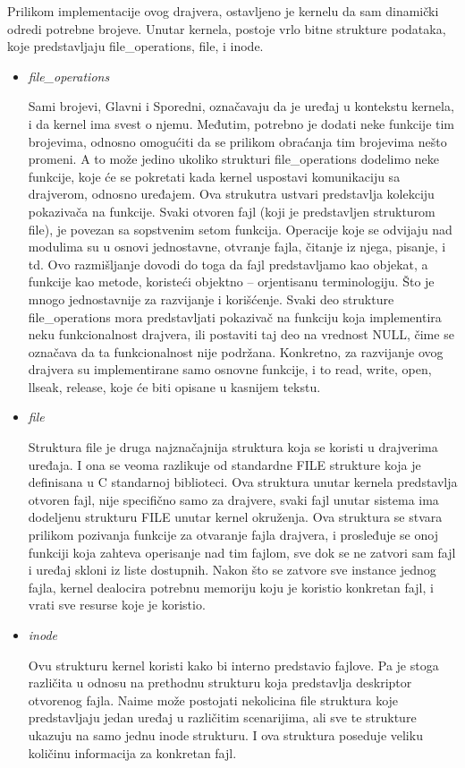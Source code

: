 \documentclass[a4paper, 12pt, diplomski]{etf}
\begin{document}
	Prilikom implementacije ovog drajvera, ostavljeno je kernelu da sam dinamički odredi potrebne brojeve. Unutar kernela, postoje vrlo bitne strukture podataka, koje predstavljaju file\_operations, file, i inode.

	\begin{itemize}

		\item \textit{file\_operations}

	Sami brojevi, Glavni i Sporedni, označavaju da je uređaj u kontekstu kernela, i da kernel ima svest o njemu. Međutim, potrebno je dodati neke funkcije tim brojevima, odnosno omogućiti da se prilikom obraćanja tim brojevima nešto promeni. A to može jedino ukoliko strukturi file\_operations dodelimo neke funkcije, koje će se pokretati kada kernel uspostavi komunikaciju sa drajverom, odnosno uređajem. Ova strukutra ustvari predstavlja kolekciju pokazivača na funkcije. Svaki otvoren fajl (koji je predstavljen strukturom file), je povezan sa sopstvenim setom funkcija. Operacije koje se odvijaju nad modulima su u osnovi jednostavne, otvranje fajla, čitanje iz njega, pisanje, i td. Ovo razmišljanje dovodi do toga da fajl predstavljamo kao objekat, a funkcije kao metode, koristeći objektno – orjentisanu terminologiju. Što je mnogo jednostavnije za razvijanje i korišćenje. Svaki deo strukture file\_operations mora predstavljati pokazivač na funkciju koja implementira neku funkcionalnost drajvera, ili postaviti taj deo na vrednost NULL, čime se označava da ta funkcionalnost nije podržana. Konkretno, za razvijanje ovog drajvera su implementirane samo osnovne funkcije, i to read, write, open, llseak, release, koje će biti opisane u kasnijem tekstu.

		\bigskip

		\item \textit{file}

	Struktura file je druga najznačajnija struktura koja se koristi u drajverima uređaja. I ona se veoma razlikuje od standardne FILE strukture koja je definisana u C standarnoj biblioteci. Ova struktura unutar kernela predstavlja otvoren fajl, nije specifično samo za drajvere, svaki fajl unutar sistema ima dodeljenu strukturu FILE unutar kernel okruženja. Ova struktura se stvara prilikom pozivanja funkcije za otvaranje fajla drajvera, i prosleđuje se onoj funkciji koja zahteva operisanje nad tim fajlom, sve dok se ne zatvori sam fajl i uređaj skloni iz liste dostupnih. Nakon što se zatvore sve instance jednog fajla, kernel dealocira potrebnu memoriju koju je koristio konkretan fajl, i vrati sve resurse koje je koristio.

		\bigskip

		\item \textit{inode}

		Ovu strukturu kernel koristi kako bi interno predstavio fajlove. Pa je stoga različita u odnosu na prethodnu strukturu koja predstavlja deskriptor otvorenog fajla. Naime može postojati nekolicina file struktura koje predstavljaju jedan uređaj u različitim scenarijima, ali sve te strukture ukazuju na samo jednu inode strukturu. I ova struktura poseduje veliku količinu informacija za konkretan fajl.

	\end{itemize}
\end{document}
